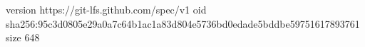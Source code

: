 version https://git-lfs.github.com/spec/v1
oid sha256:95c3d0805e29a0a7c64b1ac1a83d804e5736bd0edade5bddbe59751617893761
size 648
